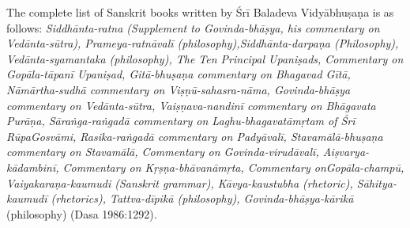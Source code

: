 The complete list of Sanskrit books written by Śrī Baladeva Vidyā\-bhuṣaṇa is as follows: {\sl Siddhānta-ratna {\rm (Supplement to {\sl Govinda-bhāṣya}, his commentary on Vedānta-sūtra)}, Prameya-ratnāvalī {\rm (philosophy)},\break Siddhānta-darpaṇa {\rm (Philosophy)}, Vedānta-syamantaka {\rm (philosophy)}, The Ten Principal Upaniṣads, {\rm Commentary on} Gopāla-tāpanī Upaniṣad, Gitā-bhuṣaṇa {\rm commentary on} Bhagavad Gītā, Nāmārtha-sudhā {\rm commentary on} Viṣṇū-sahasra-nāma, Govinda-bhāṣya {\rm commentary on} Vedā\-nta-sūtra, Vaiṣṇava-nandinī {\rm commentary on} Bhāgavata Purāṇa, Sāraṅga-raṅgadā {\rm commentary on} Laghu-bhagavatāmṛtam {\rm of Śrī Rūpa\break Gosvāmi}, Rasika-raṅgadā {\rm commentary on} Padyāvalī, Stavamālā-bhuṣaṇa {\rm commentary on} Stavamālā, {\rm Commentary on} Govinda-virudāvalī, Aiṣva\-rya-kādambinī, {\rm Commentary on} Kṛṣṇa-bhāvanāmṛta, {\rm Commentary on}\break Gopāla-champū, Vai\-ya\-karaṇa-kaumudi {\rm (Sanskrit grammar)}, Kāvya-\Break kau\-stubha {\rm (rhetoric)}, Sā\-hitya-kaumudī {\rm (rhetorics)}, Tattva-dīpikā {\rm (philosophy)}, Govinda-bhāṣya-kārikā} {\rm (philosophy)} {\rm (Dasa 1986:1292)}. 

